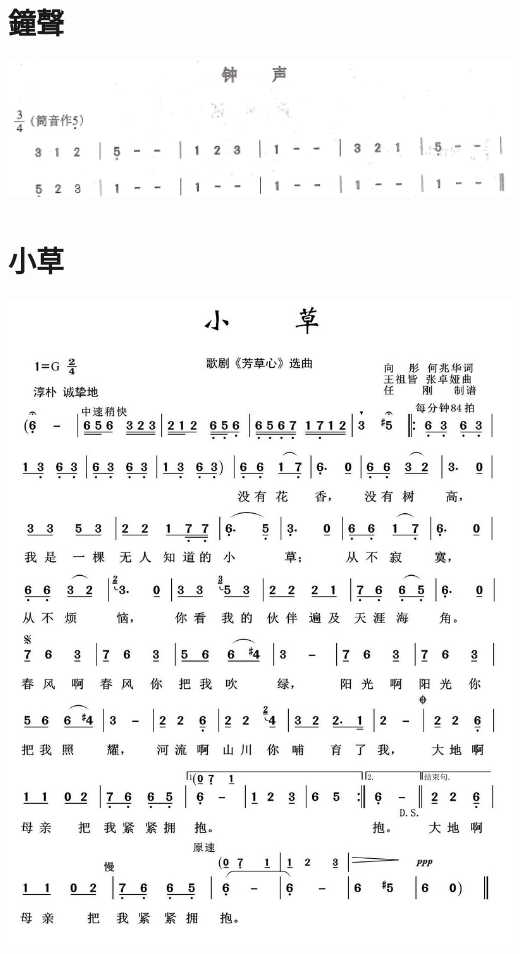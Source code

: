 \documentclass[cn,pad,twocol]{elegantbook}
\begin{document}
\section{鐘聲}                  \includegraphics[width=\textwidth]{dongxiao/20200711-钟声.jpg}
\section{小草}                  \includegraphics[width=\textwidth]{rpi400/20210131小草.jpeg}
\end{document}
